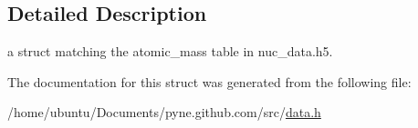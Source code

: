 \subsection{Detailed Description}
a struct matching the atomic\+\_\+mass table in nuc\+\_\+data.\+h5. 

The documentation for this struct was generated from the following file\+:\begin{DoxyCompactItemize}
\item 
/home/ubuntu/\+Documents/pyne.\+github.\+com/src/\hyperlink{data_8h}{data.\+h}\end{DoxyCompactItemize}
